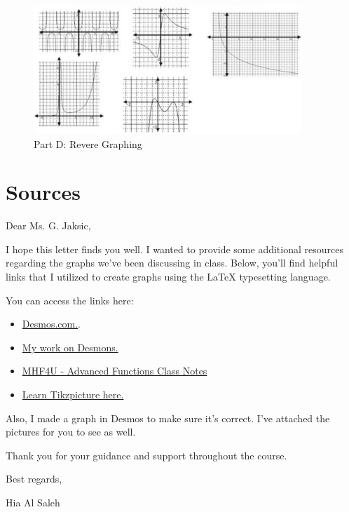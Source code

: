 \documentclass{article}
\begin{document}
\begin{figure}[h]
    \centering
    \includegraphics[width=0.9\textwidth]{imgs/imgs FSE/original_graph_part_D.png}
    \caption{Part D: Revere Graphing }
    \label{fig:image}
\end{figure}

\section*{Sources}


Dear Ms. G. Jaksic,

I hope this letter finds you well. I wanted to provide some additional resources regarding the graphs we've been discussing in class. Below, you'll find helpful links that I utilized to create graphs using the \LaTeX \;  typesetting language.

You can access the links here:

\begin{itemize}
    \item \href{https://www.desmos.com/calculator}{Desmos.com.}.
    \item \href{https://www.desmos.com/calculator/funirrjroi}{My work on Desmons.} 
    \item \href{https://www.overleaf.com/read/qnfbffqxnxzc#478dd5}{MHF4U - Advanced Functions Class Notes}
    \item \href{https://www.bu.edu/math/files/2013/08/tikzpgfmanual.pdf}{Learn Tikzpicture here.}
\end{itemize}

Also, I made a graph in Desmos to make sure it's correct. I've attached the pictures for you to see as well.


Thank you for your guidance and support throughout the course. 

Best regards,


Hia Al Saleh


\newpage
\end{document}
